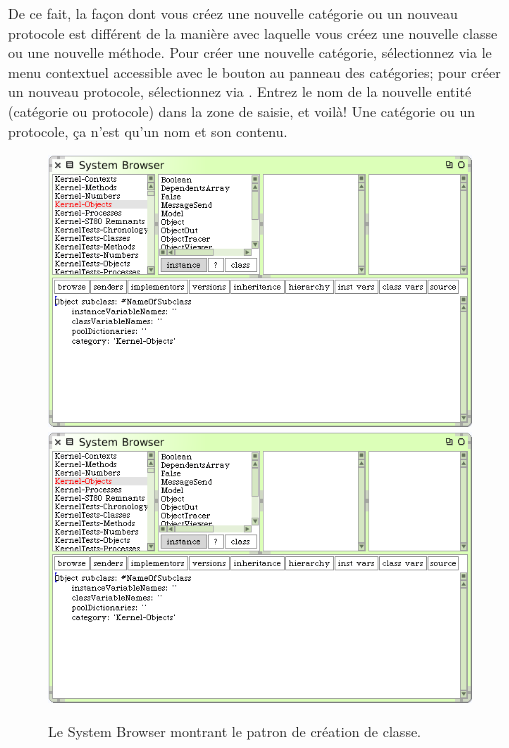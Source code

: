 \documentclass[a4paper,10pt,twoside]{book}
\begin{document}
De ce fait, la fa\c{c}on dont vous cr\'eez une nouvelle cat\'egorie ou
un nouveau protocole est diff\'erent de la mani\`ere avec laquelle
vous cr\'eez une nouvelle classe ou une nouvelle m\'ethode. 
Pour cr\'eer une nouvelle cat\'egorie, s\'electionnez 
  via le menu contextuel accessible avec le bouton 
 au panneau des cat\'egories; pour cr\'eer un nouveau protocole, 
s\'electionnez  via 
.
Entrez le nom de la nouvelle entit\'e (cat\'egorie ou protocole) dans
la zone de saisie, et voil\`a! 
Une cat\'egorie ou un protocole, \c{c}a n'est qu'un nom et son contenu.

\begin{figure}[htbp]
   \centering
   \ifluluelse
	   {\includegraphics[width=\textwidth]{SystemBrowserClassCreation}}
	   {\includegraphics[scale=.7]{SystemBrowserClassCreation}}
   \caption{Le System Browser montrant le patron de cr\'eation de classe.
   \label{fig:SystemBrowserClassCreation}}
\end{figure}
\end{document}
